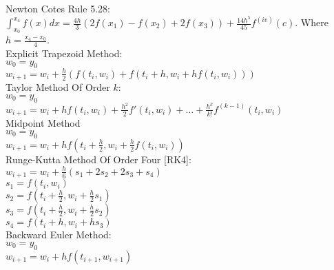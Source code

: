 Newton Cotes Rule 5.28: $\int_{x_0}^{x_4} f(x) dx = \frac{4h}{3} (2 f(x_1) - f(x_2) + 2 f(x_3)) + \frac{14 h^5}{45} f^{(iv)} (c)$. Where $h = \frac{x_4 - x_0}{4}$. \\
Explicit Trapezoid Method: \\
$w_0=y_0$ \\
$w_{i+1} = w_i + \frac{h}{2} (f(t_i,w_i) + f(t_i+h,w_i+h f(t_i,w_i)))$ \\
Taylor Method Of Order $k$: \\
$w_0 = y_0$ \\
$w_{i+1} = w_i + h f(t_i,w_i) + \frac{h^2}{2} f'(t_i,w_i) + \dots + \frac{h^k}{k!} f^{(k-1)} (t_i,w_i)$ \\
Midpoint Method \\
$w_0 = y_0$ \\
$w_{i+1} = w_i + h f \left( t_i + \frac{h}{2} , w_i + \frac{h}{2} f( t_i , w_i) \right)$ \\
Runge-Kutta Method Of Order Four [RK4]: \\
$w_{i+1} = w_i + \frac{h}{6} (s_1 + 2 s_2 + 2 s_3 + s_4)$ \\
$s_1 = f(t_i,w_i)$ \\
$s_2 = f \left( t_i + \frac{h}{2} , w_i + \frac{h}{2} s_1 \right)$ \\
$s_3 = f \left( t_i + \frac{h}{2} , w_i + \frac{h}{2} s_2 \right)$ \\
$s_4 = f ( t_i + h , w_i + h s_3)$ \\
Backward Euler Method: \\
$w_0 = y_0$ \\
$w_{i+1} = w_i + h f (t_{i+1} , w_{i+1})$